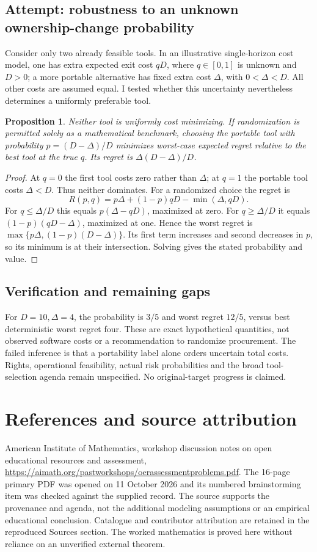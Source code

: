 \documentclass[11pt]{article}
\newtheorem{proposition}{Proposition}
\begin{document}
\subsection{Attempt: robustness to an unknown ownership-change probability}
Consider only two already feasible tools. In an illustrative single-horizon cost model, one has extra expected exit cost $qD$, where $q\in[0,1]$ is unknown and $D>0$; a more portable alternative has fixed extra cost $\Delta$, with $0<\Delta<D$. All other costs are assumed equal. I tested whether this uncertainty nevertheless determines a uniformly preferable tool.
\begin{proposition}
Neither tool is uniformly cost minimizing. If randomization is permitted solely as a mathematical benchmark, choosing the portable tool with probability $p=(D-\Delta)/D$ minimizes worst-case expected regret relative to the best tool at the true $q$. Its regret is $\Delta(D-\Delta)/D$.
\end{proposition}
\begin{proof}
At $q=0$ the first tool costs zero rather than $\Delta$; at $q=1$ the portable tool costs $\Delta<D$. Thus neither dominates. For a randomized choice the regret is
\[
R(p,q)=p\Delta+(1-p)qD-\min(\Delta,qD).
\]
For $q\le\Delta/D$ this equals $p(\Delta-qD)$, maximized at zero. For $q\ge\Delta/D$ it equals $(1-p)(qD-\Delta)$, maximized at one. Hence the worst regret is $\max\{p\Delta,(1-p)(D-\Delta)\}$. Its first term increases and second decreases in $p$, so its minimum is at their intersection. Solving gives the stated probability and value.
\end{proof}
\subsection{Verification and remaining gaps}
For $D=10,\Delta=4$, the probability is $3/5$ and worst regret $12/5$, versus best deterministic worst regret four. These are exact hypothetical quantities, not observed software costs or a recommendation to randomize procurement. The failed inference is that a portability label alone orders uncertain total costs. Rights, operational feasibility, actual risk probabilities and the broad tool-selection agenda remain unspecified. No original-target progress is claimed.

\section{References and source attribution}
American Institute of Mathematics, workshop discussion notes on open educational resources and assessment, \url{https://aimath.org/pastworkshops/oerassessmentproblems.pdf}. The 16-page primary PDF was opened on 11 October 2026 and its numbered brainstorming item was checked against the supplied record. The source supports the provenance and agenda, not the additional modeling assumptions or an empirical educational conclusion. Catalogue and contributor attribution are retained in the reproduced Sources section. The worked mathematics is proved here without reliance on an unverified external theorem.
\end{document}
